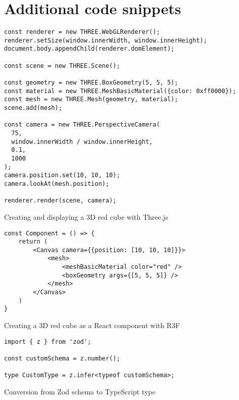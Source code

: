 \chapter{Additional code snippets} 

\begin{listing}
\begin{verbatim}
const renderer = new THREE.WebGLRenderer();
renderer.setSize(window.innerWidth, window.innerHeight);
document.body.appendChild(renderer.domElement);

const scene = new THREE.Scene();

const geometry = new THREE.BoxGeometry(5, 5, 5);
const material = new THREE.MeshBasicMaterial({color: 0xff0000});
const mesh = new THREE.Mesh(geometry, material);
scene.add(mesh);

const camera = new THREE.PerspectiveCamera(
  75,
  window.innerWidth / window.innerHeight,
  0.1,
  1000
);
camera.position.set(10, 10, 10);
camera.lookAt(mesh.position);

renderer.render(scene, camera);
\end{verbatim}
\caption{Creating and displaying a 3D red cube with Three.js}
\label{listing:threejs}
\end{listing}

\begin{listing}
\begin{verbatim}
const Component = () => {
    return (
        <Canvas camera={{position: [10, 10, 10]}}>
            <mesh>
                <meshBasicMaterial color="red" />
                <boxGeometry args={[5, 5, 5]} />
            </mesh>
        </Canvas>
    )
}
\end{verbatim}
\caption{Creating a 3D red cube as a React component with R3F}
\label{lisiting:r3f}
\end{listing}

\begin{listing}
\begin{verbatim}
import { z } from 'zod';

const customSchema = z.number();

type CustomType = z.infer<typeof customSchema>;
\end{verbatim}
\caption{Conversion from Zod schema to TypeScript type}
\label{listing:zod}
\end{listing}